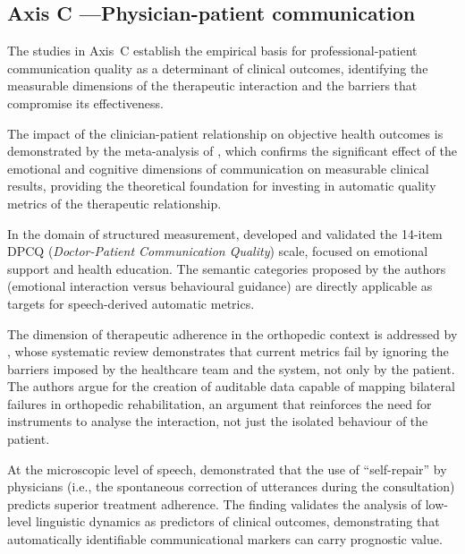 \documentclass[review,12pt]{elsarticle}
\begin{document}
\subsection{Axis C —Physician-patient communication}
\label{subsec:eixoC}

The studies in Axis~C establish the empirical basis for professional-patient
communication quality as a determinant of clinical outcomes, identifying the
measurable dimensions of the therapeutic interaction and the barriers that
compromise its effectiveness.

The impact of the clinician-patient relationship on objective health outcomes
is demonstrated by the meta-analysis of \citet{Kelley2014}, which confirms
the significant effect of the emotional and cognitive dimensions of
communication on measurable clinical results, providing the theoretical
foundation for investing in automatic quality metrics of the therapeutic
relationship.

In the domain of structured measurement, \citet{Shao2025} developed and
validated the 14-item DPCQ (\textit{Doctor-Patient Communication Quality})
scale, focused on emotional support and health education. The semantic
categories proposed by the authors (emotional interaction versus behavioural
guidance) are directly applicable as targets for speech-derived automatic
metrics.

The dimension of therapeutic adherence in the orthopedic context is addressed
by \citet{Rucinski2022}, whose systematic review demonstrates that current
metrics fail by ignoring the barriers imposed by the healthcare team and the
system, not only by the patient. The authors argue for the creation of
auditable data capable of mapping bilateral failures in orthopedic
rehabilitation, an argument that reinforces the need for instruments to
analyse the interaction, not just the isolated behaviour of the patient.

At the microscopic level of speech, \citet{McCabe2018} demonstrated that the
use of \enquote{self-repair} by physicians (i.e., the spontaneous correction
of utterances during the consultation) predicts superior treatment adherence.
The finding validates the analysis of low-level linguistic dynamics as
predictors of clinical outcomes, demonstrating that automatically identifiable
communicational markers can carry prognostic value.
\end{document}
